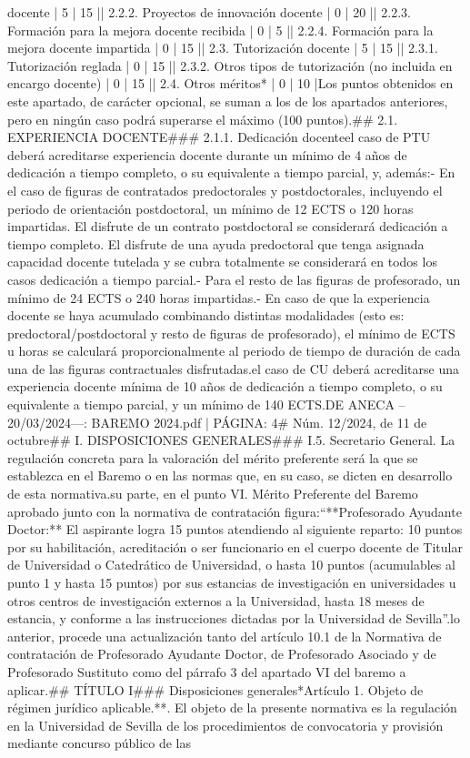 \documentclass{article}
\begin{document}
\begin{itemize}
{{docente | 5 | 15 |\n| 2.2.2. Proyectos de innovación docente | 0 | 20 |\n| 2.2.3. Formación para la mejora docente recibida | 0 | 5 |\n| 2.2.4. Formación para la mejora docente impartida | 0 | 15 |\n| 2.3. Tutorización docente | 5 | 15 |\n| 2.3.1. Tutorización reglada | 0 | 15 |\n| 2.3.2. Otros tipos de tutorización (no incluida en encargo docente) | 0 | 15 |\n| 2.4. Otros méritos* | 0 | 10 |\n\n* Los puntos obtenidos en este apartado, de carácter opcional, se suman a los de los apartados anteriores, pero en ningún caso podrá superarse el máximo (100 puntos).\n\n## 2.1. EXPERIENCIA DOCENTE\n\n### 2.1.1. Dedicación docente\n\nEn el caso de PTU deberá acreditarse experiencia docente durante un mínimo de 4 años de dedicación a tiempo completo, o su equivalente a tiempo parcial, y, además:\n\n- En el caso de figuras de contratados predoctorales y postdoctorales, incluyendo el periodo de orientación postdoctoral, un mínimo de 12 ECTS o 120 horas impartidas. El disfrute de un contrato postdoctoral se considerará dedicación a tiempo completo. El disfrute de una ayuda predoctoral que tenga asignada capacidad docente tutelada y se cubra totalmente se considerará en todos los casos dedicación a tiempo parcial.\n\n- Para el resto de las figuras de profesorado, un mínimo de 24 ECTS o 240 horas impartidas.\n\n- En caso de que la experiencia docente se haya acumulado combinando distintas modalidades (esto es: predoctoral/postdoctoral y resto de figuras de profesorado), el mínimo de ECTS u horas se calculará proporcionalmente al periodo de tiempo de duración de cada una de las figuras contractuales disfrutadas.\n\nEn el caso de CU deberá acreditarse una experiencia docente mínima de 10 años de dedicación a tiempo completo, o su equivalente a tiempo parcial, y un mínimo de 140 ECTS.\n{} DE ANECA – 20/03/2024\n\n---\n\nFUENTE: BAREMO 2024.pdf | PÁGINA: 4\n# Núm. 12/2024, de 11 de octubre\n\n## I. DISPOSICIONES GENERALES\n\n### I.5. Secretario General\n{}. La regulación concreta para la valoración del mérito preferente será la que se establezca en el Baremo o en las normas que, en su caso, se dicten en desarrollo de esta normativa.\n\nPor su parte, en el punto VI. Mérito Preferente del Baremo aprobado junto con la normativa de contratación figura:\n\n“**Profesorado Ayudante Doctor:** El aspirante logra 15 puntos atendiendo al siguiente reparto: 10 puntos por su habilitación, acreditación o ser funcionario en el cuerpo docente de Titular de Universidad o Catedrático de Universidad, o hasta 10 puntos (acumulables al punto 1 y hasta 15 puntos) por sus estancias de investigación en universidades u otros centros de investigación externos a la Universidad, hasta 18 meses de estancia, y conforme a las instrucciones dictadas por la Universidad de Sevilla”.\n\nVisto lo anterior, procede una actualización tanto del artículo 10.1 de la Normativa de contratación de Profesorado Ayudante Doctor, de Profesorado Asociado y de Profesorado Sustituto como del párrafo 3 del apartado VI del baremo a aplicar.\n\n## TÍTULO I\n\n### Disposiciones generales\n\n**Artículo 1. Objeto de régimen jurídico aplicable.**\n{}. El objeto de la presente normativa es la regulación en la Universidad de Sevilla de los procedimientos de convocatoria y provisión mediante concurso público de las }}
\end{itemize}
\end{document}
